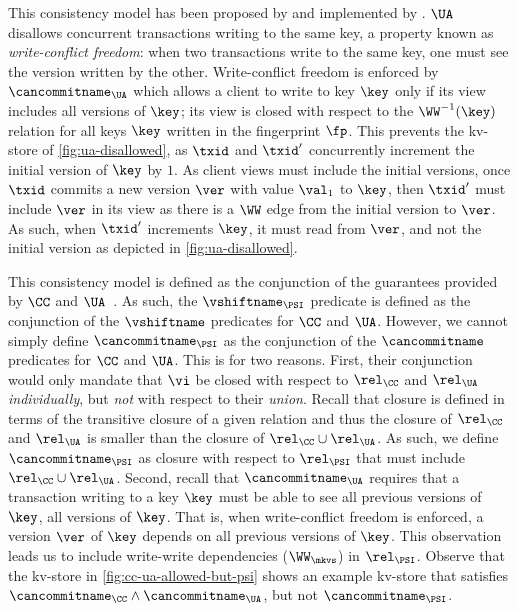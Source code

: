 This consistency model has been proposed by \citet{framework-concur} 
and implemented by \citet{rola}.
\(\UA\) disallows concurrent transactions writing to the same key,
a property known as \emph{write-conflict freedom}:  
when two transactions write to the same key, one must see the version 
written by the other.
Write-conflict freedom is enforced by \(\cancommitname_{\UA}\) which allows a client to write to key \(\key\) only if its view includes all versions of \(\key\); 
\ie its view is closed with respect to the \(\WW^{-1}(\key)\) relation for all keys \(\key\) written in the fingerprint \(\fp\).
This prevents the kv-store of \cref{fig:ua-disallowed},
as \(\txid\) and \(\txid'\) concurrently increment the initial version of \(\key\) by \(1\).
As client views must include the initial versions, once \(\txid\) commits a new version \(\ver\) with value \(\val_1\) to \(\key\), then \(\txid'\) must include \(\ver\) in its view as there is a \(\WW\) edge from the initial version to \(\ver\). 
As such, when \(\txid'\) %
increments \(\key\), it must read from \(\ver\), and not the initial version as depicted in \cref{fig:ua-disallowed}.



This consistency model is defined as the conjunction of the guarantees provided by \(\CC\) and \(\UA\)~\cite{framework-concur}. 
As such, the \(\vshiftname_{\PSI}\) predicate is defined as the conjunction of the \(\vshiftname\) predicates for \(\CC\) and \(\UA\).
However, we cannot simply define \(\cancommitname_{\PSI}\) as the conjunction of the \(\cancommitname\) predicates for \(\CC\) and \(\UA\). 
This is for two reasons. 
First, their conjunction would only mandate that \(\vi\) be closed with respect to 
\(\rel_{\CC}\) and \(\rel_{\UA}\) \emph{individually}, but \emph{not} with respect to their \emph{union}.
Recall that closure is defined in terms of the transitive closure of a given relation 
and thus the closure of \(\rel_{\CC}\) and \(\rel_{\UA}\) is smaller than the closure of \(\rel_{\CC} \cup \rel_{\UA}\).
As such, we define \(\cancommitname_{\PSI}\) as closure with respect to \(\rel_{\PSI} \) that must include \( \rel_{\CC} \cup \rel_{\UA}\).
Second, recall that \(\cancommitname_{\UA}\) requires that a transaction writing 
to a key \(\key\) must be able to see all previous versions of \(\key\), \ie all versions of \(\key\). 
That is, when write-conflict freedom is enforced, a version \(\ver\) of \(\key\) depends on all 
previous versions of \(\key\). 
This observation leads us to include write-write dependencies (\(\WW_{\mkvs}\)) in \(\rel_{\PSI}\). 
Observe that the kv-store in \cref{fig:cc-ua-allowed-but-psi} shows an example kv-store that satisfies \(\cancommitname_{\CC} \land \cancommitname_{\UA}\), 
but not \(\cancommitname_{\PSI}\).

